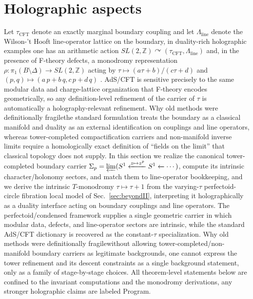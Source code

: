 \documentclass[11pt]{article}
\theoremstyle{remark}
\newcommand{\Z}{\mathbb{Z}}
\begin{document}
\section{Holographic aspects}
\label{sec:adsftheory}
Let \(\tau_{\mathrm{CFT}}\) denote an exactly marginal boundary coupling and let \(\Lambda_{\mathrm{line}}\) denote the Wilson-'t Hooft line-operator lattice on the boundary, in duality-rich holographic examples one has an arithmetic action \(SL(2,\Z)\curvearrowright (\tau_{\mathrm{CFT}},\Lambda_{\mathrm{line}})\) and, in the presence of F-theory defects, a monodromy representation \(\rho:\pi_{1}(B\setminus \Delta)\to SL(2,\Z)\) acting by \(\tau\mapsto (a\tau+b)/(c\tau+d)\) and \((p,q)\mapsto (a\,p+b\,q,c\,p+d\,q)\) \cite{Schwarz1995, Vafa1996}. AdS/CFT is sensitive precisely to the same modular data and charge-lattice organization that F-theory encodes geometrically, so any definition-level refinement of the carrier of \(\tau\) is automatically a holography-relevant refinement. Why old methods were definitionally fragile\:the standard formulation treats the boundary as a classical manifold and duality as an external identification on couplings and line operators, whereas tower-completed compactification carriers and non-manifold inverse limits require a homologically exact definition of ``fields on the limit'' that classical topology does not supply. In this section we realize the canonical tower-completed boundary carrier \(\Sigma_{p}=\varprojlim(S^{1}\xleftarrow{z\mapsto z^{p}}S^{1}\xleftarrow{}\cdots)\), compute its intrinsic character/holonomy sectors, and match them to line-operator bookkeeping, and we derive the intrinsic \(T\)-monodromy \(\tau\mapsto\tau+1\) from the varying-\(\tau\) perfectoid-circle fibration local model of Sec.~\ref{sec:beyondII}, interpreting it holographically as a duality interface acting on boundary couplings and line operators. The perfectoid/condensed framework supplies a single geometric carrier in which modular data, defects, and line-operator sectors are intrinsic, while the standard AdS/CFT dictionary is recovered as the constant-\(\tau\) specialization. Why old methods were definitionally fragile\:without allowing tower-completed/non-manifold boundary carriers as legitimate backgrounds, one cannot express the tower refinement and its descent constraints as a single background statement, only as a family of stage-by-stage choices. All theorem-level statements below are confined to the invariant computations and the monodromy derivations, any stronger holographic claims are labeled Program.
\end{document}
